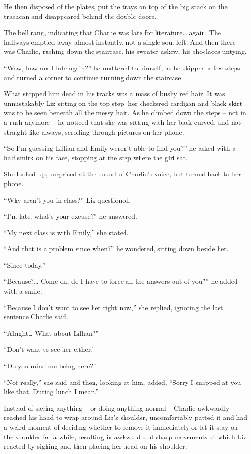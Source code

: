 He then disposed of the plates, put the trays on top of the big stack on the trashcan and disappeared behind the double doors.

\bigskip

The bell rang, indicating that Charlie was late for literature… again. The hallways emptied away almost instantly, not a single soul left. And then there was Charlie, rushing down the staircase, his sweater askew, his shoelaces untying.

“Wow, how am I late again?” he muttered to himself, as he skipped a few steps and turned a corner to continue running down the staircase.

What stopped him dead in his tracks was a mass of bushy red hair. It was unmistakably Liz sitting on the top step: her checkered cardigan and black skirt was to be seen beneath all the messy hair. As he climbed down the steps – not in a rush anymore – he noticed that she was sitting with her back curved, and not straight like always, scrolling through pictures on her phone.

“So I’m guessing Lillian and Emily weren’t able to find you?” he asked with a half smirk on his face, stopping at the step where the girl sat.

She looked up, surprised at the sound of Charlie’s voice, but turned back to her phone.

“Why aren’t you in class?” Liz questioned.

“I’m late, what’s your excuse?” he answered.

“My next class is with Emily,” she stated.

“And that is a problem since when?” he wondered, sitting down beside her.

“Since today.”

“Because?… Come on, do I have to force all the answers out of you?” he added with a smile.

“Because I don’t want to see her right now,” she replied, ignoring the last sentence Charlie said.

“Alright… What about Lillian?”

“Don’t want to see her either.”

“Do you mind me being here?”

“Not really,” she said and then, looking at him, added, “Sorry I snapped at you like that. During lunch I mean.”

Instead of saying anything – or doing anything normal – Charlie awkwardly reached his hand to wrap around Liz’s shoulder, uncomfortably patted it and had a weird moment of deciding whether to remove it immediately or let it stay on the shoulder for a while, resulting in awkward and sharp movements at which Liz reacted by sighing and then placing her head on his shoulder.

